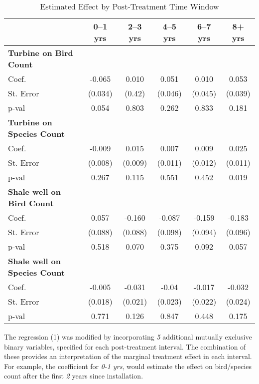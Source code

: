 \documentclass{article}
\begin{document}
\addlinespace

\begin{table}[htbp]
\centering
\caption{Estimated Effect by Post-Treatment Time Window}
\label{tab:window_effects_shale_turbine}
\begin{tabular}{lccccc}
\toprule
 & 0--1 yrs & 2--3 yrs & 4--5 yrs & 6--7 yrs & 8+ yrs \\
\midrule
\textbf{Turbine on Bird Count} \\
Coef.      & -0.065 & 0.010  & 0.051  & 0.010  & 0.053 \\
St. Error  & (0.034) & (0.42) & (0.046) & (0.045) & (0.039) \\
p-val      & 0.054 & 0.803 & 0.262 & 0.833 & 0.181 \\
\midrule
\textbf{Turbine on Species Count} \\
Coef.      & -0.009 & 0.015  & 0.007  & 0.009 & 0.025 \\
St. Error  & (0.008) & (0.009) & (0.011) & (0.012) & (0.011) \\
p-val      & 0.267 & 0.115 & 0.551 & 0.452 & 0.019 \\
\midrule
\textbf{Shale well on Bird Count} \\
Coef.      & 0.057 & -0.160 & -0.087 & -0.159 & -0.183 \\
St. Error  & (0.088) & (0.088) & (0.098) & (0.094) & (0.096) \\
p-val      & 0.518 & 0.070 & 0.375 & 0.092 & 0.057 \\
\midrule
\textbf{Shale well on Species Count} \\
Coef.      & -0.005 & -0.031 & -0.04 & -0.017 & -0.032 \\
St. Error  & (0.018) & (0.021) & (0.023) & (0.022) & (0.024) \\
p-val      & 0.771 & 0.126 & 0.847 & 0.448 & 0.175 \\
\bottomrule
\end{tabular}
\vspace{1mm}
\begin{flushleft}
\footnotesize
\end{flushleft}
\end{table}

The regression (1) was modified by incorporating \textit{5} additional mutually exclusive binary variables, specified for each post-treatment interval. The combination of these provides an interpretation of the marginal treatment effect in each interval. For example, the coefficient for \textit{0-1 yrs}, would estimate the effect on bird/species count after the first \textit{2} years since installation.
\end{document}
